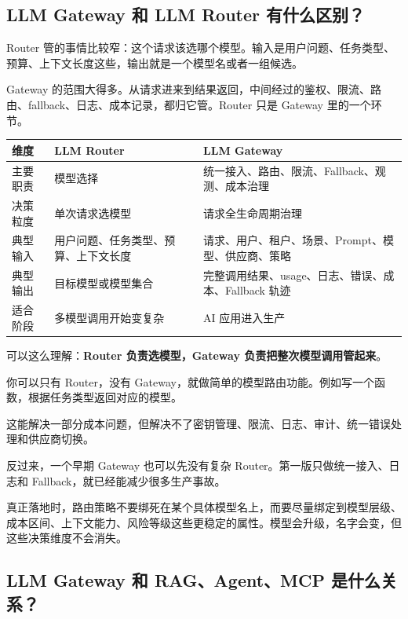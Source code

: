 \documentclass[10pt,a4paper]{ctexart}
\begin{document}
\subsection{LLM Gateway 和 LLM Router 有什么区别？}


Router 管的事情比较窄：这个请求该选哪个模型。输入是用户问题、任务类型、预算、上下文长度这些，输出就是一个模型名或者一组候选。



Gateway 的范围大得多。从请求进来到结果返回，中间经过的鉴权、限流、路由、fallback、日志、成本记录，都归它管。Router 只是 Gateway 里的一个环节。


{\footnotesize
\begin{tabularx}{\textwidth}{|X|X|X|}
\hline
\textbf{维度} & \textbf{LLM Router} & \textbf{LLM Gateway} \\
\hline
主要职责 & 模型选择 & 统一接入、路由、限流、Fallback、观测、成本治理 \\
\hline
决策粒度 & 单次请求选模型 & 请求全生命周期治理 \\
\hline
典型输入 & 用户问题、任务类型、预算、上下文长度 & 请求、用户、租户、场景、Prompt、模型、供应商、策略 \\
\hline
典型输出 & 目标模型或模型集合 & 完整调用结果、usage、日志、错误、成本、Fallback 轨迹 \\
\hline
适合阶段 & 多模型调用开始变复杂 & AI 应用进入生产 \\
\hline
\end{tabularx}
}



可以这么理解：\textbf{Router 负责选模型，Gateway 负责把整次模型调用管起来}。



你可以只有 Router，没有 Gateway，就做简单的模型路由功能。例如写一个函数，根据任务类型返回对应的模型。



这能解决一部分成本问题，但解决不了密钥管理、限流、日志、审计、统一错误处理和供应商切换。



反过来，一个早期 Gateway 也可以先没有复杂 Router。第一版只做统一接入、日志和 Fallback，就已经能减少很多生产事故。



真正落地时，路由策略不要绑死在某个具体模型名上，而要尽量绑定到模型层级、成本区间、上下文能力、风险等级这些更稳定的属性。模型会升级，名字会变，但这些决策维度不会消失。



\subsection{LLM Gateway 和 RAG、Agent、MCP 是什么关系？}
\end{document}
